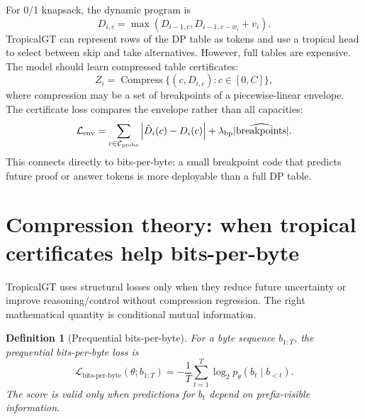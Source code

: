 \documentclass[11pt]{article}
\newtheorem{definition}{Definition}[section]
\newcommand{\calC}{\mathcal{C}}
\newcommand{\calL}{\mathcal{L}}
\newcommand{\bits}{\operatorname{bits\mbox{-}per\mbox{-}byte}}
\begin{document}
For 0/1 knapsack, the dynamic program is
\begin{equation}
D_{i,c}=\max(D_{i-1,c},D_{i-1,c-w_i}+v_i).
\end{equation}
TropicalGT can represent rows of the DP table as tokens and use a tropical head to select between skip and take alternatives.  However, full tables are expensive.  The model should learn compressed table certificates:
\begin{equation}
Z_i=\operatorname{Compress}\{(c,D_{i,c}):c\in[0,C]\},
\end{equation}
where compression may be a set of breakpoints of a piecewise-linear envelope.  The certificate loss compares the envelope rather than all capacities:
\begin{equation}
\calL_{\rm env}=\sum_{c\in\calC_{\rm probe}}\left|\hat D_i(c)-D_i(c)\right|+\lambda_{\rm bp}|\widehat{\operatorname{breakpoints}}|.
\end{equation}
This connects directly to bits-per-byte: a small breakpoint code that predicts future proof or answer tokens is more deployable than a full DP table.

\section{Compression theory: when tropical certificates help bits-per-byte}

TropicalGT uses structural losses only when they reduce future uncertainty or improve reasoning/control without compression regression.  The right mathematical quantity is conditional mutual information.

\begin{definition}[Prequential bits-per-byte]
For a byte sequence \(b_{1:T}\), the prequential bits-per-byte loss is
\begin{equation}
\calL_{\bits}(\theta;b_{1:T})=-\frac1T\sum_{t=1}^T \log_2 p_\theta(b_t\mid b_{<t}).
\end{equation}
The score is valid only when predictions for \(b_t\) depend on prefix-visible information.
\end{definition}
\end{document}
